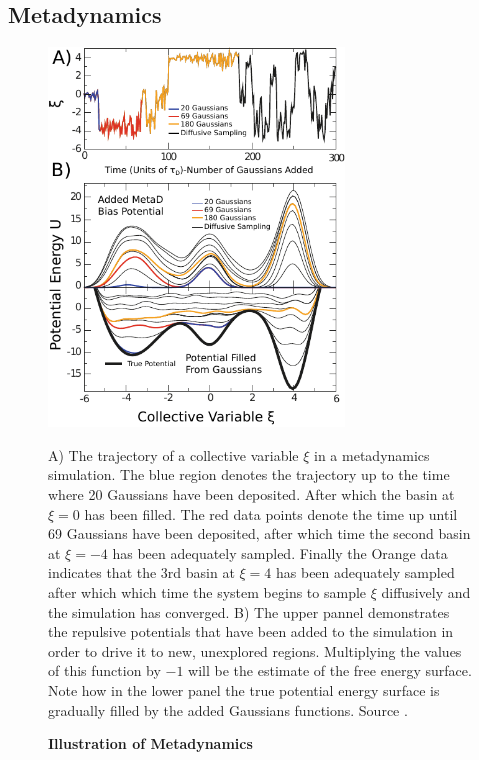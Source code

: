 \subsection{Metadynamics}
\begin{figure}
	\begin{center}
		\includegraphics[width=0.7\textwidth]{figures/METAD_demonstration.pdf}
	\end{center}
	\captionsetup{singlelinecheck = false, justification=raggedright}
	\caption[Illustration of Metadynamics] {\textbf{Illustration of Metadynamics}}{A) The trajectory of a collective variable $\xi$ in a  metadynamics simulation. The blue region denotes the trajectory up to the time where 20 Gaussians have been deposited. After which the basin at $\xi=0$ has been filled. The red data points denote the time up until 69 Gaussians have been deposited, after which time the second basin at $\xi=-4$ has been adequately sampled. Finally the Orange data indicates that the 3rd basin at $\xi=4$ has been adequately sampled after which which time the system begins to sample $\xi$ diffusively and the simulation has converged. B) The upper pannel demonstrates the repulsive potentials that have been added to the simulation in order to drive it to new, unexplored regions. Multiplying the values of this function by $-1$  will be the estimate of the free energy surface. Note how in the lower panel the true potential energy surface is gradually filled by the added Gaussians functions.  Source \cite{bussi2020}}.
	\label{METAD_demonstration}
\end{figure}

